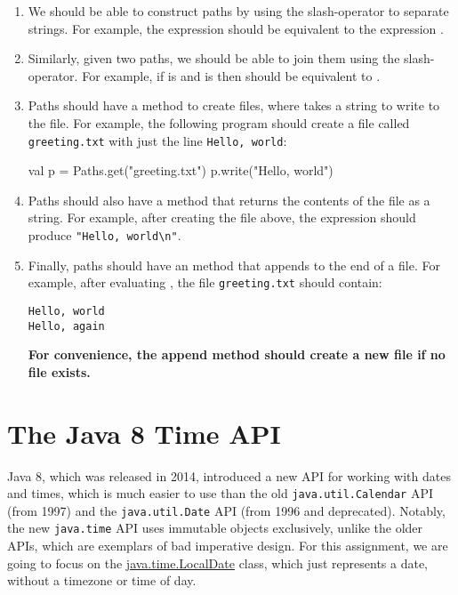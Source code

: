 \documentclass[9pt]{extbook}
\begin{document}
\begin{enumerate}

  \item We should be able to construct paths by using the slash-operator to separate strings. For example, the expression  should be equivalent to the expression . 
  \item Similarly, given two paths, we should be able to join them using the slash-operator. For example, if  is  and  is  then  should be equivalent to . 
  \item Paths should have a  method to create files, where  takes a string to write to the file. For example, the following program should create a file called \texttt{greeting.txt} with just the line \texttt{Hello, world}: %
\begin{scalacode}
val p = Paths.get("greeting.txt")
p.write("Hello, world\n")
\end{scalacode}	

  \item Paths should also have a  method that returns the contents of the file as a string. For example, after creating the file above, the expression  should produce \verb|"Hello, world\n"|.

  \item Finally, paths should have an  method that appends to the end of a file. For example, after evaluating  , the file \texttt{greeting.txt} should contain:

\begin{verbatim}
Hello, world
Hello, again
\end{verbatim}

    \textbf{For convenience, the append method should create a new file if no file exists.}

\end{enumerate}

\section{The Java 8 Time API}

Java 8, which was released in 2014, introduced a new API for working with dates and times, which is much easier to use than the old \texttt{java.util.Calendar} API (from 1997) and the \texttt{java.util.Date} API (from 1996 and deprecated). Notably, the new \texttt{java.time} API uses immutable objects exclusively, unlike the older APIs, which are exemplars of bad imperative design. For this assignment, we are going to focus on the \href{https://docs.oracle.com/javase/8/docs/api/java/time/LocalDate.html}{java.time.LocalDate} class, which just represents a date, without a timezone or time of day.
\end{document}
